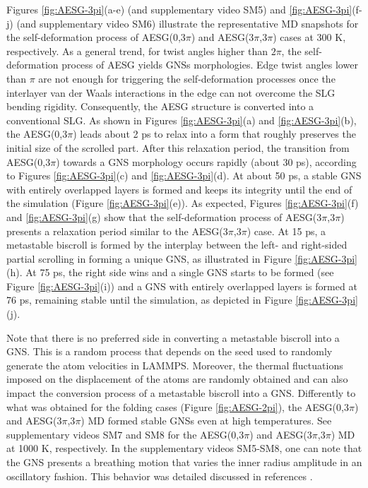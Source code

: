 \documentclass[twoside,twocolumn,9pt]{article}
\begin{document}
Figures \ref{fig:AESG-3pi}(a-e) (and supplementary video SM5) and \ref{fig:AESG-3pi}(f-j) (and supplementary video SM6) illustrate the representative MD snapshots for the self-deformation process of AESG(0,3$\pi$) and AESG(3$\pi$,3$\pi$) cases at 300 K, respectively. As a general trend, for twist angles higher than $2\pi$, the self-deformation process of AESG yields GNSs morphologies. Edge twist angles lower than $\pi$ are not enough for triggering the self-deformation processes once the interlayer van der Waals interactions in the edge can not overcome the SLG bending rigidity. Consequently, the AESG structure is converted into a conventional SLG. As shown in Figures \ref{fig:AESG-3pi}(a) and \ref{fig:AESG-3pi}(b), the AESG(0,3$\pi$) leads about 2 ps to relax into a form that roughly preserves the initial size of the scrolled part. After this relaxation period, the transition from AESG(0,3$\pi$) towards a GNS morphology occurs rapidly (about 30 ps), according to Figures \ref{fig:AESG-3pi}(c) and \ref{fig:AESG-3pi}(d). At about 50 ps, a stable GNS with entirely overlapped layers is formed and keeps its integrity until the end of the simulation (Figure \ref{fig:AESG-3pi}(e)). As expected, Figures \ref{fig:AESG-3pi}(f) and \ref{fig:AESG-3pi}(g) show that the self-deformation process of AESG(3$\pi$,3$\pi$) presents a relaxation period similar to the AESG(3$\pi$,3$\pi$) case. At 15 ps, a metastable biscroll is formed by the interplay between the left- and right-sided partial scrolling in forming a unique GNS, as illustrated in Figure \ref{fig:AESG-3pi}(h). At 75 ps, the right side wins and a single GNS starts to be formed (see Figure \ref{fig:AESG-3pi}(i)) and a GNS with entirely overlapped layers is formed at 76 ps, remaining stable until the simulation, as depicted in Figure \ref{fig:AESG-3pi}(j).

Note that there is no preferred side in converting a metastable biscroll into a GNS. This is a random process that depends on the seed used to randomly generate the atom velocities in LAMMPS. Moreover, the thermal fluctuations imposed on the displacement of the atoms are randomly obtained and can also impact the conversion process of a metastable biscroll into a GNS. Differently to what was obtained for the folding cases (Figure \ref{fig:AESG-2pi}), the AESG(0,3$\pi$) and AESG(3$\pi$,3$\pi$) MD formed stable GNSs even at high temperatures. See supplementary videos SM7 and SM8 for the AESG(0,3$\pi$) and AESG(3$\pi$,3$\pi$) MD at 1000 K, respectively. In the supplementary videos SM5-SM8, one can note that the GNS presents a breathing motion that varies the inner radius amplitude in an oscillatory fashion. This behavior was detailed discussed in references \cite{shi2009gigahertz}.
\end{document}
